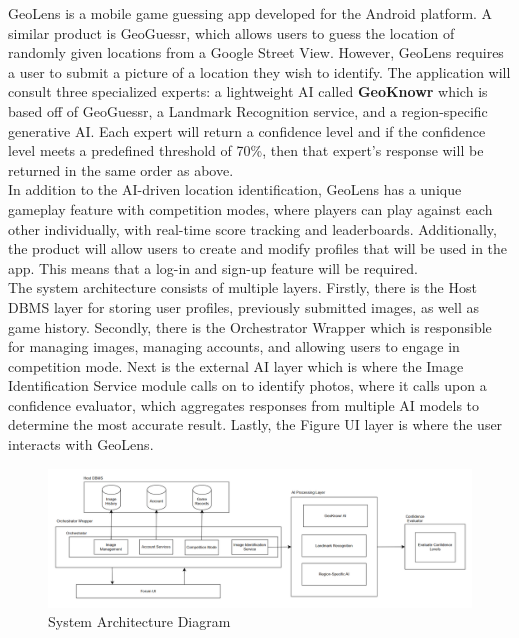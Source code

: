 \documentclass[]{article}
\begin{document}
\noindent GeoLens is a mobile game guessing app developed for the Android platform. A similar product is GeoGuessr, which allows users to guess the location of randomly given locations from a Google Street View. However, GeoLens requires a user to submit a picture of a location they wish to identify. The application will consult three specialized experts: a lightweight AI called \textbf{GeoKnowr} which is based off of GeoGuessr, a Landmark Recognition service, and a region-specific generative AI. Each expert will return a confidence level and if the confidence level meets a predefined threshold of 70\%, then that expert's response will be returned in the same order as above.\\

\noindent In addition to the AI-driven location identification, GeoLens has a unique gameplay feature with competition modes, where players can play against each other individually, with real-time score tracking and leaderboards. Additionally, the product will allow users to create and modify profiles that will be used in the app. This means that a log-in and sign-up feature will be required.\\

\noindent The system architecture consists of multiple layers. Firstly, there is the Host DBMS layer for storing user profiles, previously submitted images, as well as game history. Secondly, there is the Orchestrator Wrapper which is responsible for managing images, managing accounts, and allowing users to engage in competition mode. Next is the external AI layer which is where the Image Identification Service module calls on to identify photos, where it calls upon a confidence evaluator, which aggregates responses from multiple AI models to determine the most accurate result. Lastly, the Figure UI layer is where the user interacts with GeoLens.\\

\begin{figure}[h]
    \centering
    \includegraphics[width=1\linewidth]{system_diagram.png}
    \caption{System Architecture Diagram}
    \label{fig:system_diagram}
\end{figure}
\end{document}
